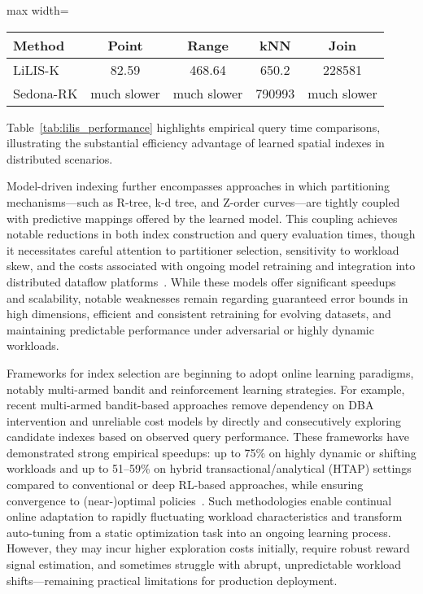 \documentclass[sigconf]{acmart}
\begin{document}
\begin{table*}[htbp]
\centering
\caption{Query times (ms) for spatial queries using LiLIS and Sedona-RK on large datasets~\cite{ref111}. ''Much slower'' indicates high latency or infeasibility for the corresponding method.}
\label{tab:lilis_performance}
\begin{adjustbox}{max width=\textwidth}
\begin{tabular}{@{}lcccc@{}}
\toprule
Method & Point & Range & kNN & Join \\
\midrule
LiLIS-K & 82.59 & 468.64 & 650.2 & 228581 \\
Sedona-RK & much slower & much slower & 790993 & much slower \\
\bottomrule
\end{tabular}
\end{adjustbox}
\end{table*}

Table~\ref{tab:lilis_performance} highlights empirical query time comparisons, illustrating the substantial efficiency advantage of learned spatial indexes in distributed scenarios.

Model-driven indexing further encompasses approaches in which partitioning mechanisms—such as R-tree, k-d tree, and Z-order curves—are tightly coupled with predictive mappings offered by the learned model. This coupling achieves notable reductions in both index construction and query evaluation times, though it necessitates careful attention to partitioner selection, sensitivity to workload skew, and the costs associated with ongoing model retraining and integration into distributed dataflow platforms~\cite{ref110,ref111}. While these models offer significant speedups and scalability, notable weaknesses remain regarding guaranteed error bounds in high dimensions, efficient and consistent retraining for evolving datasets, and maintaining predictable performance under adversarial or highly dynamic workloads.

Frameworks for index selection are beginning to adopt online learning paradigms, notably multi-armed bandit and reinforcement learning strategies. For example, recent multi-armed bandit-based approaches remove dependency on DBA intervention and unreliable cost models by directly and consecutively exploring candidate indexes based on observed query performance. These frameworks have demonstrated strong empirical speedups: up to 75\% on highly dynamic or shifting workloads and up to 51–59\% on hybrid transactional/analytical (HTAP) settings compared to conventional or deep RL-based approaches, while ensuring convergence to (near-)optimal policies~\cite{ref105}. Such methodologies enable continual online adaptation to rapidly fluctuating workload characteristics and transform auto-tuning from a static optimization task into an ongoing learning process. However, they may incur higher exploration costs initially, require robust reward signal estimation, and sometimes struggle with abrupt, unpredictable workload shifts—remaining practical limitations for production deployment.
\end{document}
